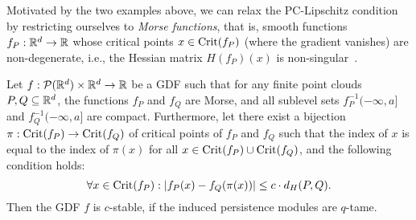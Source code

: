 Motivated by the two examples above, we can relax the PC-Lipschitz condition by
restricting ourselves to \emph{Morse functions}, that is, smooth functions $f_P
: \mathbb{R}^d \to \mathbb{R}$ whose critical points $x \in \operatorname{Crit}(f_P)$ (where the gradient
vanishes) are non-degenerate, i.e., the Hessian matrix $H(f_P)(x)$ is
non-singular~\cite{matsumoto2002introduction}.
\begin{theorem}
    Let $f : \mathcal{P}(\mathbb{R}^d) \times \mathbb{R}^d \to \mathbb{R}$ be a GDF such that for any
    finite point clouds $P, Q \subseteq \mathbb{R}^d$, the functions $f_P$ and $f_Q$ are
    Morse, and all sublevel sets $f_P^{-1}(-\infty, a]$ and $f_Q^{-1}(-\infty, a]$
    are compact. Furthermore, let there exist a bijection
    $\pi: \operatorname{Crit}(f_P) \to \operatorname{Crit}(f_Q)$ of critical points of $f_P$ and $f_Q$
    such that the index of $x$ is equal to the index of $\pi(x)$ for all
    $x \in \operatorname{Crit}(f_P) \cup \operatorname{Crit}(f_Q)$, and the following condition holds:
    \begin{equation}
        \label{eq:morse_crit}
        \forall x \in \operatorname{Crit}(f_P):
        |f_P(x) - f_Q(\pi(x))| \leq c \cdot d_H(P, Q).
    \end{equation}
    Then the GDF $f$ is $c$-stable, if the induced persistence modules are
    $q$-tame.
\end{theorem}
